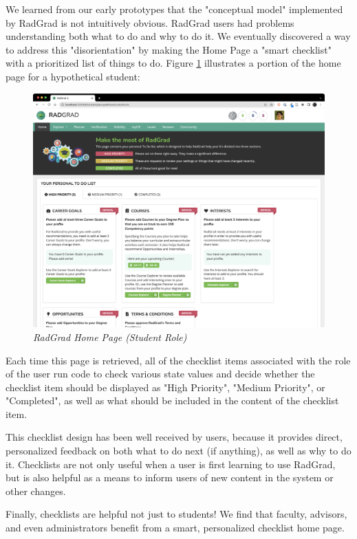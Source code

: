 \documentclass[acmsmall,nonacm]{acmart}
\begin{document}
We learned from our early prototypes that the "conceptual model" implemented by RadGrad is not intuitively obvious. RadGrad users had problems understanding both what to do and why to do it.  We eventually discovered a way to address this "disorientation" by making the Home Page a "smart checklist" with a prioritized list of things to do.  Figure \ref{fig:radgrad-student-home-page} illustrates a portion of the home page for a hypothetical student:

\begin{figure}[ht]
\centering
\includegraphics[width=\linewidth]{george-checklist.png}
\caption{\em RadGrad Home Page (Student Role)}
\label{fig:radgrad-student-home-page}
\end{figure}

Each time this page is retrieved, all of the checklist items associated with the role of the user run code to check various state values and decide whether the checklist item should be displayed as "High Priority", "Medium Priority", or "Completed", as well as what should be included in the content of the checklist item.

This checklist design has been well received by users, because it provides direct, personalized feedback on both what to do next (if anything), as well as why to do it. Checklists are not only useful when a user is first learning to use RadGrad, but is also helpful as a means to inform users of new content in the system or other changes.

Finally, checklists are helpful not just to students!  We find that faculty, advisors, and even administrators benefit from a smart, personalized checklist home page.
\end{document}

